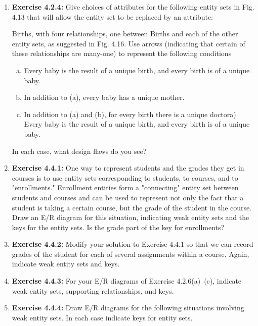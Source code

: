 \documentclass[12pt]{article}
\begin{document}
\begin{enumerate}[1.]
    \item \textbf{Exercise 4.2.4:} Give choices of attributes for the following entity sets in
    Fig. 4.13 that will allow the entity set to be replaced by an attribute:

    \bigskip

    Births, with four relationships, one between Births and each of the other entity
    sets, as suggested in Fig. 4.16. Use arrows (indicating that certain of these
    relationships are many-one) to represent the following conditions

    \bigskip

    \begin{enumerate}[a)]
        \item Every baby is the result of a unique birth, and every birth is of a unique baby.
        \item In addition to (a), every baby has a unique mother.
        \item In addition to (a) and (b), for every birth there is a unique doctora) Every baby is the result of a unique birth, and every birth is of a unique baby.
    \end{enumerate}

    \bigskip

    In each case, what design flaws do you see?

    \item \textbf{Exercise 4.4.1:} One way to represent students and the grades they get in
    courses is to use entity sets corresponding to students, to courses, and to "enrollments."
    Enrollment entities form a "connecting" entity set between students
    and courses and can be used to represent not only the fact that a student is
    taking a certain course, but the grade of the student in the course. Draw an
    E/R diagram for this situation, indicating weak entity sets and the keys for the
    entity sets. Is the grade part of the key for enrollments?

    \item \textbf{Exercise 4.4.2:} Modify your solution to Exercise 4.4.1 so that we can record
    grades of the student for each of several assignments within a course. Again,
    indicate weak entity sets and keys.

    \item \textbf{Exercise 4.4.3:} For your E/R diagrams of Exercise 4.2.6(a)~(c), indicate weak
    entity sets, supporting relationships, and keys.

    \item \textbf{Exercise 4.4.4:} Draw E/R diagrams for the following situations involving
    weak entity sets. In each case indicate keys for entity sets.


\end{enumerate}
\end{document}
